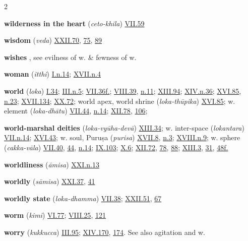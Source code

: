 \begin{multicols}{2}
\begin{vismHanging}
\par\textbf{wilderness in the heart} (\emph{ceto-khila}) \hyperlink{VII.59}{VII.59}{}
\par\textbf{wisdom} (\emph{veda}) \hyperlink{XXII.70}{XXII.70}{}, \hyperlink{XXII.75}{75}{}, \hyperlink{XXII.89}{89}{}
\par\textbf{wishes} , see evilness of w. \& fewness of w.
\par\textbf{woman} (\emph{itthi}) \hyperlink{I.n14}{I.n.14}{}; \hyperlink{XVII.n4}{XVII.n.4}{}
\par\textbf{world} (\emph{loka}) \hyperlink{I.34}{I.34}{}; \hyperlink{III.n5}{III.n.5}{}; \hyperlink{VII.36}{VII.36f.}{}; \hyperlink{VIII.39}{VIII.39}{}, \hyperlink{VIII.n11}{n.11}{}; \hyperlink{XIII.94}{XIII.94}{}; \hyperlink{XIV.n36}{XIV.n.36}{}; \hyperlink{XVI.85}{XVI.85}{}, \hyperlink{XVI.n23}{n.23}{}; \hyperlink{XVII.134}{XVII.134}{}; \hyperlink{XX.72}{XX.72}{}; world apex, world shrine (\emph{loka-thūpika}) \hyperlink{XVI.85}{XVI.85}{}; w. element (\emph{loka-dhātu}) \hyperlink{VII.44}{VII.44}{}, \hyperlink{VII.n14}{n.14}{}; \hyperlink{XII.78}{XII.78}{}, \hyperlink{XII.106}{106}{};
\par\textbf{world-marshal deities} (\emph{loka-vyūha-devā}) \hyperlink{XIII.34}{XIII.34}{}; w. inter-space (\emph{lokantara}) \hyperlink{VII.n14}{VII.n.14}{}; \hyperlink{XVI.43}{XVI.43}{}; w. soul, Puruṣa (\emph{purisa}) \hyperlink{XVII.8}{XVII.8}{}, \hyperlink{XVII.n3}{n.3}{}; \hyperlink{XVIII.n9}{XVIII.n.9}{}; w. sphere (\emph{cakka-vāla}) \hyperlink{VII.40}{VII.40}{}, \hyperlink{VII.44}{44}{}, \hyperlink{VII.n14}{n.14}{}; \hyperlink{IX.103}{IX.103}{}; \hyperlink{X.6}{X.6}{}; \hyperlink{XII.72}{XII.72}{}, \hyperlink{XII.78}{78}{}, \hyperlink{XII.88}{88}{}; \hyperlink{XIII.3}{XIII.3}{}, \hyperlink{XIII.31}{31}{}, \hyperlink{XIII.48}{48f.}{}
\par\textbf{worldliness} (\emph{āmisa}) \hyperlink{XXI.n13}{XXI.n.13}{}
\par\textbf{worldly} (\emph{sāmisa}) \hyperlink{XXI.37}{XXI.37}{}, \hyperlink{XXI.41}{41}{}
\par\textbf{worldly state} (\emph{loka-dhamma}) \hyperlink{VII.38}{VII.38}{}; \hyperlink{XXII.51}{XXII.51}{}, \hyperlink{XXII.67}{67}{}
\par\textbf{worm} (\emph{kimi}) \hyperlink{VI.77}{VI.77}{}; \hyperlink{VIII.25}{VIII.25}{}, \hyperlink{VIII.121}{121}{}
\par\textbf{worry} (\emph{kukkucca}) \hyperlink{III.95}{III.95}{}; \hyperlink{XIV.170}{XIV.170}{}, \hyperlink{XIV.174}{174}{}. See also agitation and w.

\end{vismHanging}
\end{multicols}
